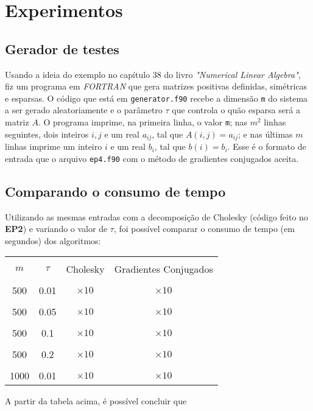 \documentclass[a4paper,11pt]{article}
\begin{document}
    \section{Experimentos}
        \subsection{Gerador de testes}
            Usando a ideia do exemplo no capítulo 38 do livro \textit{"Numerical Linear Algebra"}, fiz um programa em \textit{FORTRAN} que gera matrizes positivas definidas, simétricas e esparsas. O código que está em \texttt{generator.f90} recebe a dimensão \texttt{m} do sistema a ser gerado aleatoriamente e o parâmetro $\tau$ que controla o quão esparsa será a matriz $A$. O programa imprime, na primeira linha, o valor \texttt{m}; nas $m^2$ linhas seguintes, dois inteiros $i,j$ e um real $a_{ij}$, tal que $A(i,j)=a_{ij}$; e nas últimas $m$ linhas imprime um inteiro $i$ e um real $b_i$, tal que $b(i)=b_i$. Esse é o formato de entrada que o arquivo \texttt{ep4.f90} com o método de gradientes conjugados aceita.
        
        \subsection{Comparando o consumo de tempo}    
            Utilizando as mesmas entradas com a decomposição de Cholesky (código feito no \textbf{EP2}) e variando o valor de $\tau$, foi possível comparar o consumo de tempo (em segundos) dos algoritmos:
            \begin{center}
                \begin{tabular}{ | c | c | c | c | } 
                    \hline
                    & & \\ [-1em]
                    $m$ & $\tau$ & Cholesky & Gradientes Conjugados\\  [+.5em]
                    \hline\hline
                    & & & \\ [-1em]
                    500 & 0.01 & $ \times 10^{}$ & $ \times 10^{}$ \\ [+.5em]
                    \hline
                    & & & \\ [-1em]
                    500 & 0.05 & $ \times 10^{}$ & $ \times 10^{}$ \\ [+.5em]
                    \hline
                    & & & \\ [-1em]
                    500 & 0.1 & $ \times 10^{}$ & $ \times 10^{}$ \\ [+.5em]
                    \hline
                    & & & \\ [-1em]
                    500 & 0.2 & $ \times 10^{}$ & $ \times 10^{}$ \\ [+.5em]
                    \hline\hline
                    & & & \\ [-1em]
                    1000 & 0.01 & $ \times 10^{}$ & $ \times 10^{}$ \\ [+.5em]
                    \hline
                \end{tabular}
            \end{center}
            A partir da tabela acima, é possível concluir que
\end{document}
